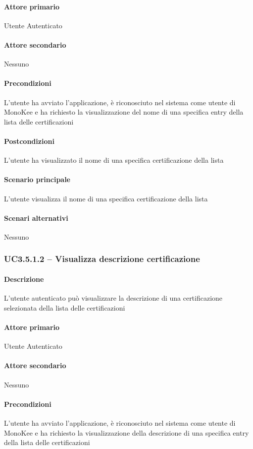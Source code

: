 \paragraph{Attore primario}  Utente Autenticato
\paragraph{Attore secondario}  Nessuno
\paragraph{Precondizioni} L’utente ha avviato l’applicazione, è riconosciuto nel sistema come utente di MonoKee e ha richiesto la visualizzazione del nome di una specifica entry della lista delle certificazioni
\paragraph{Postcondizioni}  L’utente ha visualizzato il nome di una specifica certificazione della lista
\paragraph{Scenario principale}  
L’utente visualizza il nome di una specifica certificazione della lista
\paragraph{Scenari alternativi}  Nessuno




\subsubsection{UC3.5.1.2 – Visualizza descrizione certificazione}
\paragraph{Descrizione}  L’utente autenticato può visualizzare la descrizione di una certificazione selezionata della lista delle certificazioni
\paragraph{Attore primario}  Utente Autenticato
\paragraph{Attore secondario}  Nessuno
\paragraph{Precondizioni} L’utente ha avviato l’applicazione, è riconosciuto nel sistema come utente di MonoKee e ha richiesto la visualizzazione della descrizione di una specifica entry della lista delle certificazioni
